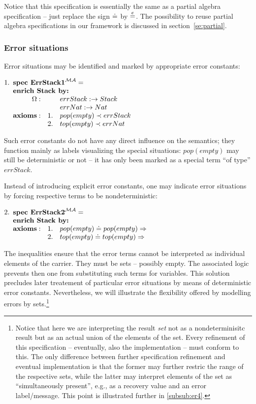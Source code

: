 \documentclass[10pt]{article}
\begin{document}
Notice
that this  specification is essentially the same as a partial
algebra specification -- just replace the sign $\mathrel{\dot{=} }$ by $\stackrel{e}{=}$. The
possibility to reuse partial algebra specifications in our framework is
discussed in section~\ref{se:partial}.

\subsubsection{Error situations}\label{subsub:er2}
Error situations may be identified and marked by appropriate error constants:
\vspace*{1ex}

\(
1. \spec{	\tit{\mbox{\bf spec\ ErrStack1}^{\inst{MA}}=} \\
	\tit{\mbox{\bf enrich\ Stack\  by:}} \\
	    	\Ops:	&& errStack: \to Stack\\
		        && errNat: \to Nat \\
	 	{\bf axioms:}
			&1.& pop(empty) \prec errStack\\
			&2.& top(empty) \prec errNat
}
\) 

\noindent
Such error constants do not have any
direct influence on the semantics; they function mainly as labels visualizing
the special situations:
$pop(empty)$ may still be deterministic or not -- it has only been marked as a
special term ``of type'' $errStack$. 

Instead of introducing explicit error constants, one may indicate error
situations by forcing respective terms to be nondeterministic:
\vspace*{1ex}

\(
2. \spec{	\tit{\mbox{\bf spec\ ErrStack2}^{\inst{MA}}=} \\
	\tit{\mbox{\bf enrich\ Stack\  by:}} \\
	 	{\bf axioms:}
			&1.& pop(empty) \eleq pop(empty) \To\\
			&2.& top(empty) \eleq top(empty) \To
}
\)  

\noindent
The inequalities ensure that the error terms cannot be interpreted as
individual elements of the carrier. They must be sets -- possibly empty. The
associated logic prevents then one from substituting such terms for
variables. This solution precludes later treatement of particular error
situations by means of deterministic error constants.  Nevertheless, we will
illustrate the flexibility offered by modelling errors by
sets.\footnote{Notice that here we are interpreting the result {\em set} not
as a nondeterminisitc result but as an actual union of the elements of the
set. Every refinement of this specification -- eventually, also the
implementation -- must conform to this. The only difference between further
specification refinement and eventual implementation is that the former may
further restric the range of the respective sets, while the latter may
interpret elements of the set as ``simultaneously present'', e.g., as a
recovery value and an error label/message. This point is illustrated further
in \ref{subsub:er4}.}
\end{document}
